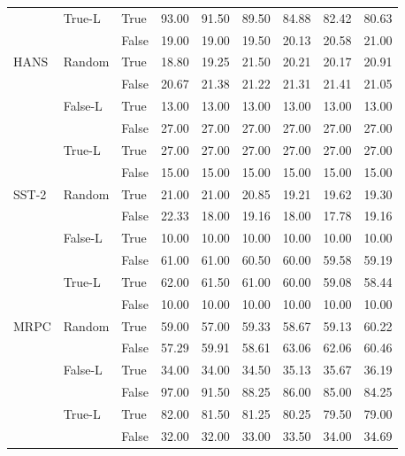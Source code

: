 \begin{table*}[h!]
\begin{tabular}{lllllllll}
  \cmidrule{2-9}
  & \multirow{2}{*}{True-L} & True & 93.00 & 91.50 & 89.50 & 84.88 & 82.42 & 80.63 \\
  \cmidrule{3-9}
  & & False & 19.00 & 19.00 & 19.50 & 20.13 & 20.58 & 21.00 \\  
  \midrule
  \multirow{6}{*}{HANS} & \multirow{2}{*}{Random} & True & 18.80 & 19.25 & 21.50 & 20.21 & 20.17 & 20.91 \\
  \cmidrule{3-9}
  & & False & 20.67 & 21.38 & 21.22 & 21.31 & 21.41 & 21.05 \\
  \cmidrule{2-9}
  & \multirow{2}{*}{False-L} & True & 13.00 & 13.00 & 13.00 & 13.00 & 13.00 & 13.00 \\
  \cmidrule{3-9}
  & & False & 27.00 & 27.00 & 27.00 & 27.00 & 27.00 & 27.00 \\
  \cmidrule{2-9}
  & \multirow{2}{*}{True-L} & True & 27.00 & 27.00 & 27.00 & 27.00 & 27.00 & 27.00 \\
  \cmidrule{3-9}
  & & False & 15.00 & 15.00 & 15.00 & 15.00 & 15.00 & 15.00 \\  
  \midrule
  \multirow{6}{*}{SST-2} & \multirow{2}{*}{Random} & True & 21.00 & 21.00 & 20.85 & 19.21 & 19.62 & 19.30 \\
  \cmidrule{3-9}
  & & False & 22.33 & 18.00 & 19.16 & 18.00 & 17.78 & 19.16 \\
  \cmidrule{2-9}
  & \multirow{2}{*}{False-L} & True & 10.00 & 10.00 & 10.00 & 10.00 & 10.00 & 10.00 \\
  \cmidrule{3-9}
  & & False & 61.00 & 61.00 & 60.50 & 60.00 & 59.58 & 59.19 \\
  \cmidrule{2-9}
  & \multirow{2}{*}{True-L} & True & 62.00 & 61.50 & 61.00 & 60.00 & 59.08 & 58.44 \\
  \cmidrule{3-9}
  & & False & 10.00 & 10.00 & 10.00 & 10.00 & 10.00 & 10.00 \\  
  \midrule
  \multirow{6}{*}{MRPC} & \multirow{2}{*}{Random} & True & 59.00 & 57.00 & 59.33 & 58.67 & 59.13 & 60.22 \\
  \cmidrule{3-9}
  & & False & 57.29 & 59.91 & 58.61 & 63.06 & 62.06 & 60.46 \\
  \cmidrule{2-9}
  & \multirow{2}{*}{False-L} & True & 34.00 & 34.00 & 34.50 & 35.13 & 35.67 & 36.19 \\
  \cmidrule{3-9}
  & & False & 97.00 & 91.50 & 88.25 & 86.00 & 85.00 & 84.25 \\
  \cmidrule{2-9}
  & \multirow{2}{*}{True-L} & True & 82.00 & 81.50 & 81.25 & 80.25 & 79.50 & 79.00 \\
  \cmidrule{3-9}
  & & False & 32.00 & 32.00 & 33.00 & 33.50 & 34.00 & 34.69 \\  

\end{tabular}
\end{table*}
